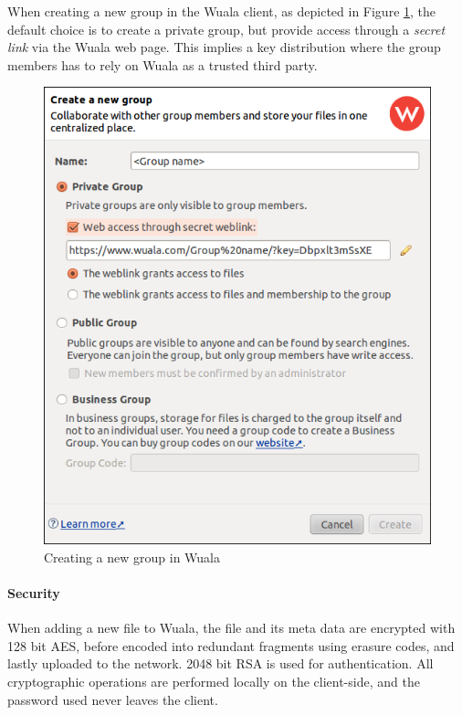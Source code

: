\documentclass[pdftex,english,10pt,b5paper,twoside]{book}
\begin{document}
When creating a new group in the Wuala client, as depicted in Figure
\ref{fig:wuala:newgroup}, the default choice is to create a private group, but
provide access through a \emph{secret link} via the Wuala web page.
This implies a key distribution where the group members has to rely on Wuala as
a trusted third party.

\begin{figure}[h!]
    \centering
    \includegraphics[width=\columnwidth]{wuala_create_group.png}
    \caption{Creating a new group in Wuala}
    \label{fig:wuala:newgroup}
\end{figure}

\paragraph{Security} When adding a new file to Wuala, the file and its meta
data are encrypted with 128 bit \ac{AES}, before encoded into redundant
fragments using erasure codes, and lastly uploaded to the network. 2048 bit
\ac{RSA} is used for authentication. All cryptographic operations are performed
locally on the client-side, and the password used never leaves the client.
\end{document}
